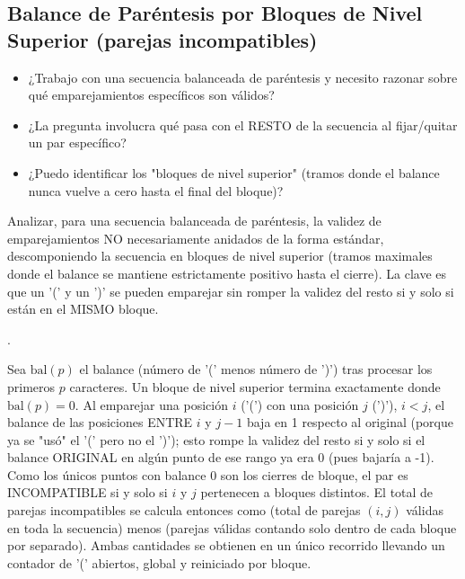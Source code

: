 \subsection{Balance de Paréntesis por Bloques de Nivel Superior (parejas incompatibles)}


\begin{itemize}
\item ¿Trabajo con una secuencia balanceada de paréntesis y necesito razonar sobre qué emparejamientos específicos son válidos?
\item ¿La pregunta involucra qué pasa con el RESTO de la secuencia al fijar/quitar un par específico?
\item ¿Puedo identificar los "bloques de nivel superior" (tramos donde el balance nunca vuelve a cero hasta el final del bloque)?
\end{itemize}

 Analizar, para una secuencia balanceada de paréntesis, la validez de emparejamientos NO necesariamente anidados de la forma estándar, descomponiendo la secuencia en bloques de nivel superior (tramos maximales donde el balance se mantiene estrictamente positivo hasta el cierre). La clave es que un '(' y un ')' se pueden emparejar sin romper la validez del resto si y solo si están en el MISMO bloque.

 .

 Sea $\text{bal}(p)$ el balance (número de '(' menos número de ')') tras procesar los primeros $p$ caracteres. Un bloque de nivel superior termina exactamente donde $\text{bal}(p) = 0$. Al emparejar una posición $i$ ('(') con una posición $j$ (')'), $i<j$, el balance de las posiciones ENTRE $i$ y $j-1$ baja en 1 respecto al original (porque ya se "usó" el '(' pero no el ')'); esto rompe la validez del resto si y solo si el balance ORIGINAL en algún punto de ese rango ya era 0 (pues bajaría a -1). Como los únicos puntos con balance 0 son los cierres de bloque, el par es INCOMPATIBLE si y solo si $i$ y $j$ pertenecen a bloques distintos. El total de parejas incompatibles se calcula entonces como (total de parejas $(i,j)$ válidas en toda la secuencia) menos (parejas válidas contando solo dentro de cada bloque por separado). Ambas cantidades se obtienen en un único recorrido llevando un contador de '(' abiertos, global y reiniciado por bloque.


